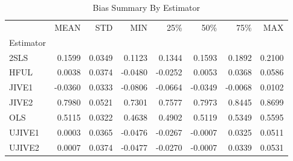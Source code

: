 \begin{table}[ht]
\centering
\caption{Bias Summary By Estimator}
\begin{tabular}{lrrrrrrr}
\toprule
 & MEAN & STD & MIN & 25\% & 50\% & 75\% & MAX \\
Estimator &  &  &  &  &  &  &  \\
\midrule
2SLS & 0.1599 & 0.0349 & 0.1123 & 0.1344 & 0.1593 & 0.1892 & 0.2100 \\
HFUL & 0.0038 & 0.0374 & -0.0480 & -0.0252 & 0.0053 & 0.0368 & 0.0586 \\
JIVE1 & -0.0360 & 0.0333 & -0.0806 & -0.0664 & -0.0349 & -0.0068 & 0.0102 \\
JIVE2 & 0.7980 & 0.0521 & 0.7301 & 0.7577 & 0.7973 & 0.8445 & 0.8699 \\
OLS & 0.5115 & 0.0322 & 0.4638 & 0.4902 & 0.5119 & 0.5349 & 0.5595 \\
UJIVE1 & 0.0003 & 0.0365 & -0.0476 & -0.0267 & -0.0007 & 0.0325 & 0.0511 \\
UJIVE2 & 0.0007 & 0.0374 & -0.0477 & -0.0270 & -0.0007 & 0.0339 & 0.0531 \\
\bottomrule
\end{tabular}
\end{table}
